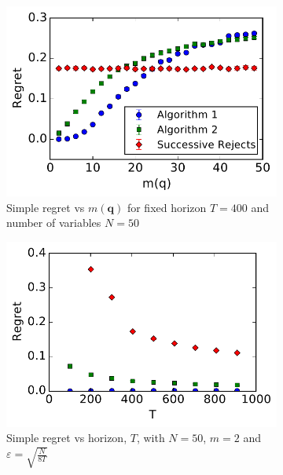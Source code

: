 \documentclass{article}
\theoremstyle{plain}
\theoremstyle{definition}
\let\epsilon\varepsilon
\begin{document}
\begin{figure}
    \begin{subfigure}[t]{0.3\textwidth}
		\centering    
    		\includegraphics[width=\textwidth]{exp_regret_vs_m_N50_T400_s10000_20160519_1030.pdf}
    		\caption{Simple regret vs $m(\boldsymbol{q})$ for fixed horizon $T=400$ and number of variables $N = 50$}
        \label{fig:simple_vs_m}
    \end{subfigure}\hfill
    \begin{subfigure}[t]{0.3\textwidth}
    		\centering
        \includegraphics[width=\textwidth]{experiment2_N50_a4_s10000_20160519_1030.pdf}
    		\caption{Simple regret vs horizon, $T$, with $N = 50$, $m=2$ and $\epsilon = \sqrt{\frac{N}{8T}}$}
        \label{fig:simple_vs_T_vary_epsilon}
    \end{subfigure}\hfill
    \begin{subfigure}[t]{0.3\textwidth}

\end{subfigure}
\end{figure}
\end{document}
